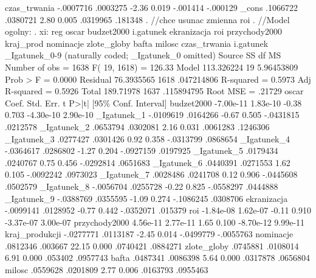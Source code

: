\begin{stlog}
  czas_trwania {\VBAR}  -.0007716   .0003275    -2.36   0.019     -.001414   -.000129
         _cons {\VBAR}   .1066722   .0380721     2.80   0.005     .0319965     .181348
{\smallskip}
. //chce usunac zmienna roi
. //Model ogolny:
. xi: reg oscar  budzet2000 i.gatunek ekranizacja roi przychody2000 kraj_prod nominacje zlote_globy bafta
 milosc czas_trwania
i.gatunek         _Igatunek_0-9       (naturally coded; _Igatunek_0 omitted)
{\smallskip}
      Source {\VBAR}       SS       df       MS              Number of obs =    1638
           F( 19,  1618) =  126.33
       Model {\VBAR}  113.326224    19  5.96453809           Prob > F      =  0.0000
    Residual {\VBAR}  76.3935565  1618  .047214806           R-squared     =  0.5973
           Adj R-squared =  0.5926
       Total {\VBAR}   189.71978  1637  .115894795           Root MSE      =  .21729
{\smallskip}
         oscar {\VBAR}      Coef.   Std. Err.      t    P>|t|     [95\% Conf. Interval]
    budzet2000 {\VBAR}  -7.00e-11   1.83e-10    -0.38   0.703    -4.30e-10    2.90e-10
   _Igatunek_1 {\VBAR}  -.0109619   .0164266    -0.67   0.505    -.0431815    .0212578
   _Igatunek_2 {\VBAR}   .0653794   .0302081     2.16   0.031     .0061283    .1246306
   _Igatunek_3 {\VBAR}   .0277427   .0301426     0.92   0.358    -.0313799    .0868654
   _Igatunek_4 {\VBAR}  -.0364617   .0286802    -1.27   0.204    -.0927159    .0197925
   _Igatunek_5 {\VBAR}   .0179434   .0240767     0.75   0.456    -.0292814    .0651683
   _Igatunek_6 {\VBAR}   .0440391   .0271553     1.62   0.105    -.0092242    .0973023
   _Igatunek_7 {\VBAR}   .0028486   .0241708     0.12   0.906    -.0445608    .0502579
   _Igatunek_8 {\VBAR}  -.0056704   .0255728    -0.22   0.825    -.0558297    .0444888
   _Igatunek_9 {\VBAR}  -.0388769   .0355595    -1.09   0.274    -.1086245    .0308706
   ekranizacja {\VBAR}  -.0099141   .0128952    -0.77   0.442    -.0352071     .015379
           roi {\VBAR}  -1.84e-08   1.62e-07    -0.11   0.910    -3.37e-07    3.00e-07
 przychody2000 {\VBAR}   4.56e-11   2.77e-11     1.65   0.100    -8.70e-12    9.99e-11
kraj_produkcji {\VBAR}  -.0277771   .0113187    -2.45   0.014    -.0499779   -.0055763
     nominacje {\VBAR}   .0812346    .003667    22.15   0.000     .0740421    .0884271
   zlote_globy {\VBAR}   .0745881   .0108014     6.91   0.000      .053402    .0957743
         bafta {\VBAR}   .0487341   .0086398     5.64   0.000     .0317878    .0656804
        milosc {\VBAR}   .0559628   .0201809     2.77   0.006     .0163793    .0955463

\end{stlog}
